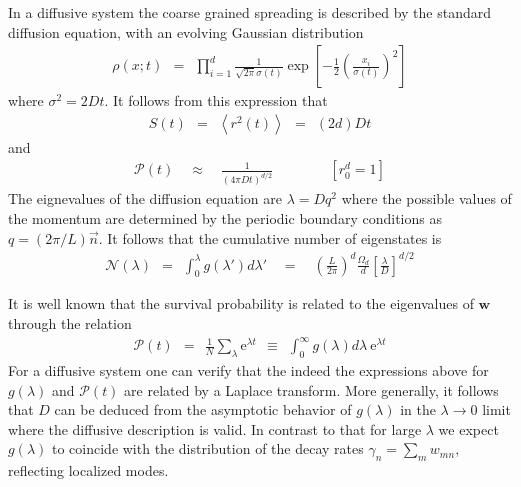 \documentclass[portrait,final,a0paper]{baposter}
\newcommand{\eexp}{\mbox{e}^}
\newcommand{\beq}{\begin{eqnarray}}
\newcommand{\eeq}{\end{eqnarray}}
\begin{document}
\begin{poster}
{In a diffusive system the coarse grained spreading 
is described by the standard diffusion equation,
with an evolving Gaussian distribution  
%  
\beq
\rho(x;t) \ \ = \ \ \prod_{i=1}^d \frac{1}{\sqrt{2\pi}\sigma(t)} 
\exp\left[-\frac{1}{2}\left(\frac{x_i}{\sigma(t)}\right)^2 \right]
\eeq
%
where $\sigma^2=2Dt$. It follows from this expression that 
% 
\beq
S(t) \ \ = \ \ \left\langle r^2(t) \right\rangle  \ \ = \ \ (2d)Dt
\eeq
%
and 
%
\beq
\mathcal{P}(t) \quad \approx \quad  \frac{1}{\left({4\pi D t}\right)^{d/2}} 
\qquad\qquad[r_0^d=1]
\eeq
%
The eignevalues of the diffusion equation are $\lambda=Dq^2$ 
where the possible values of the momentum are determined  
by the periodic boundary conditions as $q=(2\pi/L)\vec{n}$. 
It follows that the cumulative number of eigenstates is  
%
\beq \label{eq:expected_D_2d}
\mathcal{N}(\lambda) \ \ = \ \ 
\int_0^\lambda g(\lambda')d\lambda' \quad 
= \quad \left(\frac{L}{2\pi}\right)^d
\frac{\Omega_d}{d}
\left[\frac{\lambda}{D}\right]^{d/2}
\eeq



It is well known that the survival probability 
is related to the eigenvalues of $\bm{w}$ through the relation
%
\beq \label{eq:survival}
\mathcal{P}(t) \ \ = \ \ \frac{1}{N}\sum_\lambda \eexp{\lambda t} \ \ \equiv \ \ \int_0^{\infty} g(\lambda)d\lambda \ \eexp{\lambda t}
\eeq
%
For a diffusive system one can verify that the 
indeed the expressions above 
for $g(\lambda)$ and $\mathcal{P}(t)$ 
are related by a Laplace transform.  
%
More generally, it follows that $D$ can be deduced from 
the asymptotic behavior of $g(\lambda)$
in the ${\lambda\rightarrow 0}$ limit  
where the diffusive description is valid.
%
In contrast to that for large $\lambda$ we expect $g(\lambda)$ to coincide 
with the distribution of the decay rates $\gamma_n=\sum_{m}w_{mn}$, 
reflecting localized modes.

}


\end{poster}
\end{document}

